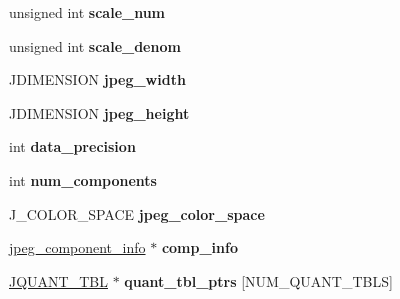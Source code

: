 \begin{DoxyCompactItemize}
\item 
\hypertarget{structjpeg__compress__struct_a16eb7e2e1ac30c42e8bd753bde43129c}{unsigned int {\bfseries scale\-\_\-num}}\label{structjpeg__compress__struct_a16eb7e2e1ac30c42e8bd753bde43129c}

\item 
\hypertarget{structjpeg__compress__struct_ab30f569483d6c25032aa2c18c885e91c}{unsigned int {\bfseries scale\-\_\-denom}}\label{structjpeg__compress__struct_ab30f569483d6c25032aa2c18c885e91c}

\item 
\hypertarget{structjpeg__compress__struct_ab433b317fcbe32212122621e476ac9d8}{J\-D\-I\-M\-E\-N\-S\-I\-O\-N {\bfseries jpeg\-\_\-width}}\label{structjpeg__compress__struct_ab433b317fcbe32212122621e476ac9d8}

\item 
\hypertarget{structjpeg__compress__struct_abc2cf065c0faab28327f7238949f76d3}{J\-D\-I\-M\-E\-N\-S\-I\-O\-N {\bfseries jpeg\-\_\-height}}\label{structjpeg__compress__struct_abc2cf065c0faab28327f7238949f76d3}

\item 
\hypertarget{structjpeg__compress__struct_a64c5b59e436f7d3d1d38b58d49993469}{int {\bfseries data\-\_\-precision}}\label{structjpeg__compress__struct_a64c5b59e436f7d3d1d38b58d49993469}

\item 
\hypertarget{structjpeg__compress__struct_a524f0284a6fcf96b21c8a745282c15e2}{int {\bfseries num\-\_\-components}}\label{structjpeg__compress__struct_a524f0284a6fcf96b21c8a745282c15e2}

\item 
\hypertarget{structjpeg__compress__struct_a7fb5305ec135340eddc2ebabec6a84d7}{J\-\_\-\-C\-O\-L\-O\-R\-\_\-\-S\-P\-A\-C\-E {\bfseries jpeg\-\_\-color\-\_\-space}}\label{structjpeg__compress__struct_a7fb5305ec135340eddc2ebabec6a84d7}

\item 
\hypertarget{structjpeg__compress__struct_ac68dd6e6b3ff7c358ebfa7f166ee6d55}{\hyperlink{structjpeg__component__info}{jpeg\-\_\-component\-\_\-info} $\ast$ {\bfseries comp\-\_\-info}}\label{structjpeg__compress__struct_ac68dd6e6b3ff7c358ebfa7f166ee6d55}

\item 
\hypertarget{structjpeg__compress__struct_a46a71a5c527558d788e442d5b40aebc2}{\hyperlink{structJQUANT__TBL}{J\-Q\-U\-A\-N\-T\-\_\-\-T\-B\-L} $\ast$ {\bfseries quant\-\_\-tbl\-\_\-ptrs} \mbox{[}N\-U\-M\-\_\-\-Q\-U\-A\-N\-T\-\_\-\-T\-B\-L\-S\mbox{]}}\label{structjpeg__compress__struct_a46a71a5c527558d788e442d5b40aebc2}


\end{DoxyCompactItemize}
